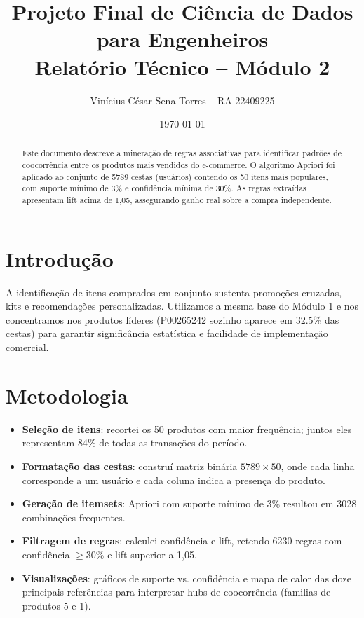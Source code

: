 ﻿\documentclass[12pt]{article}
\title{Projeto Final de Ciência de Dados para Engenheiros\\Relatório Técnico -- Módulo 2}
\author{Vinícius César Sena Torres -- RA 22409225}
\date{\today}
\begin{document}
\maketitle

\begin{abstract}
Este documento descreve a mineração de regras associativas para identificar padrões de coocorrência entre os produtos mais vendidos do e-commerce. O algoritmo Apriori foi aplicado ao conjunto de \num{5789} cestas (usuários) contendo os 50 itens mais populares, com suporte mínimo de 3\% e confidência mínima de 30\%. As regras extraídas apresentam lift acima de 1,05, assegurando ganho real sobre a compra independente.
\end{abstract}

\section{Introdução}
A identificação de itens comprados em conjunto sustenta promoções cruzadas, kits e recomendações personalizadas. Utilizamos a mesma base do Módulo 1 e nos concentramos nos produtos líderes (P00265242 sozinho aparece em \num{32.5}\% das cestas) para garantir significância estatística e facilidade de implementação comercial.

\section{Metodologia}
\begin{itemize}
    \item \textbf{Seleção de itens}: recortei os 50 produtos com maior frequência; juntos eles representam \num{84}\% de todas as transações do período.
    \item \textbf{Formatação das cestas}: construí matriz binária \(5789 \times 50\), onde cada linha corresponde a um usuário e cada coluna indica a presença do produto.
    \item \textbf{Geração de itemsets}: Apriori com suporte mínimo de 3\% resultou em \num{3028} combinações frequentes.
    \item \textbf{Filtragem de regras}: calculei confidência e lift, retendo \num{6230} regras com confidência \(\geq 30\%\) e lift superior a 1,05.
    \item \textbf{Visualizações}: gráficos de suporte vs. confidência e mapa de calor das doze principais referências para interpretar hubs de coocorrência (familias de produtos 5 e 1).
\end{itemize}
\end{document}
